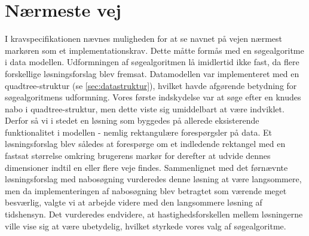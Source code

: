 \section{Nærmeste vej}
I kravspecifikationen nævnes muligheden for at se navnet på vejen nærmest markøren som et implementationskrav. Dette måtte formås med en søgealgoritme i data modellen. Udformningen af søgealgoritmen lå imidlertid ikke fast, da flere forskellige løsningsforslag blev fremsat. Datamodellen var implementeret med en quadtree-struktur (se \ref{sec:datastruktur}), hvilket havde afgørende betydning for søgealgoritmens udformning. Vores første indskydelse var at søge efter en knudes nabo i quadtree-struktur, men dette viste sig umiddelbart at være indviklet. Derfor så vi i stedet en løsning som byggedes på allerede eksisterende funktionalitet i modellen - nemlig rektangulære forespørgsler på data. Et løsningsforslag blev således at forespørge om et indledende rektangel med en fastsat størrelse omkring brugerens markør for derefter at udvide dennes dimensioner indtil en eller flere veje findes. Sammenlignet med det førnævnte løsningsforslag med nabosøgning vurderedes denne løsning at være langsommere, men da implementeringen af nabosøgning blev betragtet som værende meget besværlig, valgte vi at arbejde videre med den langsommere løsning af tidshensyn. Det vurderedes endvidere, at hastighedsforskellen mellem løsningerne ville vise sig at være ubetydelig, hvilket styrkede vores valg af søgealgoritme.